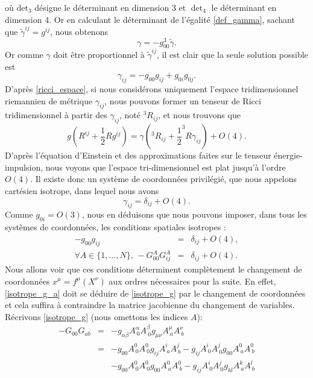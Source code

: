 			où $\mathrm{det}_3$ désigne le déterminant en dimension 3 et $\det_4$ le déterminant en dimension 4.
			Or en calculant le déterminant de l'égalité \ref{def_gamma}, sachant que $\tilde{\gamma}^{ij}=g^{ij}$, nous obtenons
			\begin{equation}
				\gamma=-g_{00}^3\tilde{\gamma}. 
			\end{equation}
			Or comme $\gamma$ doit être proportionnel à $\tilde{\gamma}^{ij}$, il est clair que la seule solution possible est 
			\begin{equation}
			\gamma_{ij}=-g_{00}g_{ij}+g_{0i}g_{0j}.	
			\end{equation}
			D'après \ref{ricci_espace}, si nous considérons uniquement l'espace tridimensionnel riemannien de métrique $\gamma_{ij}$, nous pouvons former un tenseur de Ricci tridimensionnel à partir des $\gamma_{ij}$, noté $^3R_{ij}$, et nous trouvons que
			\begin{equation}
				g\left(R^{ij}+\frac{1}{2}Rg^{ij}\right)=\gamma\left(^3R_{ij}+ \frac{1}{2}^3R\gamma_{ij} \right) + O(4).
			\end{equation}
			D'après l'équation d'Einstein et des approximations faites sur le tenseur énergie-impulsion, nous voyons que l'espace tri-dimensionnel est plat jusqu'à l'ordre $O(4)$. Il existe donc un système de coordonnées privilégié, que nous appelons cartésien isotrope, dans lequel nous avons
			\begin{equation}
				\gamma_{ij}=\delta_{ij}+O(4).
			\end{equation}
			Comme $g_{0i}=O(3)$, nous en déduisons que nous pouvons imposer, dans tous les systèmes de coordonnées, les conditions spatiales isotropes :
			\begin{eqnarray}
				-g_{00}g_{ij}&=&\delta_{ij}+O(4), \label{isotrope_g} \\ 
				\forall A\in\{1,\ldots,N\},\, -G_{00}^AG^A_{ij}&=&\delta_{ij}+O(4). \label{isotrope_g_a}
			\end{eqnarray}
			Nous allons voir que ces conditions déterminent complètement le changement de coordonnées $x^\mu=f^\mu(X^\nu)$ aux ordres nécessaires pour la suite. En effet, \ref{isotrope_g_a} doit se déduire de \ref{isotrope_g} par le changement de coordonnées et cela suffira à contraindre la matrice jacobienne du changement de variables. Récrivons \ref{isotrope_g} (nous omettons les indices $A$):
			\begin{eqnarray}
				-G_{00}G_{ab}&=& -g_{\alpha\beta}A^\alpha_{\ 0}A^{\beta}_{\ 0}g_{\mu\nu}A^{\mu}_{\ a}A^\nu_{\ b} \\
							 &=& -g_{00}A^0_{\ 0}A^0_{\ 0}g_{ij}A^i_{\ a}A^j_{\ b} - g_{ij}A^i_{\ 0}A^j_{\ 0}g_{00}A^0_{\ a}A^0_{\ b} \nonumber\\
							  && -g_{00}A^0_{\ 0}A^0_{\ 0}g_{00}A^0_{\ a}A^0_{\ b} - g_{ij}A^i_{\ 0}A^j_{\ 0} g_{kl}A^k_{\ a}A^l_{\ b} \label{calcul_int}
			\end{eqnarray}
